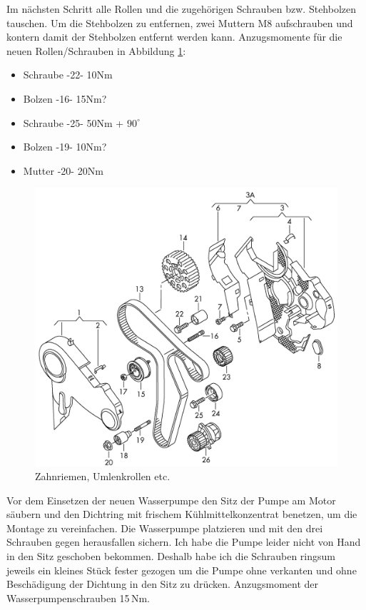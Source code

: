 \documentclass[twoside,a4paper]{refart}
\begin{document}
Im nächsten Schritt alle Rollen und die zugehörigen Schrauben bzw. Stehbolzen tauschen. Um die Stehbolzen zu entfernen, zwei Muttern M8 aufschrauben und kontern damit  der Stehbolzen entfernt werden kann.
Anzugsmomente für die neuen Rollen/Schrauben in Abbildung \ref{fig:zahnriemen}:
\begin{itemize}
	\item Schraube -22- 10Nm
	\item Bolzen -16- 15Nm?
	\item Schraube -25- 50Nm + $90^\circ$
	\item Bolzen -19- 10Nm?
	\item Mutter -20- 20Nm
\end{itemize}
\begin{figure}[htb]
	\begin{center}
		\includegraphics[width=\textwidth]{Zahnriemen}
		\caption{Zahnriemen, Umlenkrollen etc.}
		\label{fig:zahnriemen}
	\end{center}
\end{figure}
Vor dem Einsetzen der neuen Wasserpumpe den Sitz der Pumpe am Motor säubern und den Dichtring mit frischem Kühlmittelkonzentrat benetzen, um die Montage zu vereinfachen. Die Wasserpumpe platzieren und mit den drei Schrauben gegen herausfallen sichern. Ich habe die Pumpe leider nicht von Hand in den Sitz geschoben bekommen. Deshalb habe ich die Schrauben ringsum jeweils ein kleines Stück fester gezogen um die Pumpe ohne verkanten und ohne Beschädigung der Dichtung in den Sitz zu drücken. Anzugsmoment der Wasserpumpenschrauben 15\,Nm.
\end{document}
